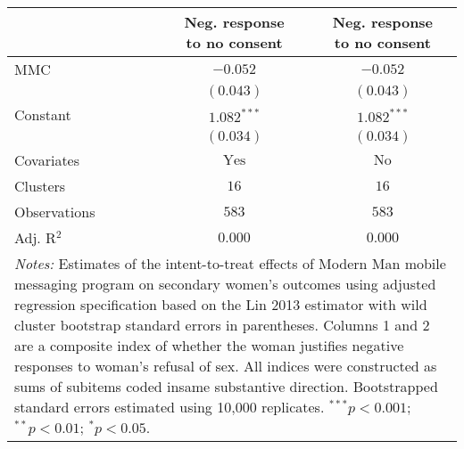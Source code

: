 
\begin{tabular}{l c c}
\toprule
 & \shortstack{Neg. response \\ to no consent} & \shortstack{Neg. response \\ to no consent} \\
\midrule
MMC          & $-0.052$       & $-0.052$      \\
             & $(0.043)$      & $(0.043)$     \\
Constant     & $1.082^{***}$  & $1.082^{***}$ \\
             & $(0.034)$      & $(0.034)$     \\
\midrule
Covariates   & $\textrm{Yes}$ & $\textrm{No}$ \\
Clusters     & $16$           & $16$          \\
Observations & $583$          & $583$         \\
Adj. R$^2$   & $0.000$        & $0.000$       \\
\bottomrule
\multicolumn{3}{l}{\scriptsize{\parbox{\linewidth}{\vspace{2pt}
       \textit{Notes:} Estimates of the intent-to-treat effects of Modern Man mobile
       messaging program on secondary women's outcomes using adjusted regression
       specification based on the Lin 2013 estimator with wild cluster bootstrap
       standard errors in parentheses. Columns 1 and 2 are a composite index of
       whether the woman justifies negative responses to woman's refusal of sex. All indices were
       constructed as sums of subitems coded insame substantive direction. 
       Bootstrapped standard errors estimated using 10,000 replicates. \\ $^{***}p<0.001$; $^{**}p<0.01$; $^{*}p<0.05$.}}}
\end{tabular}
